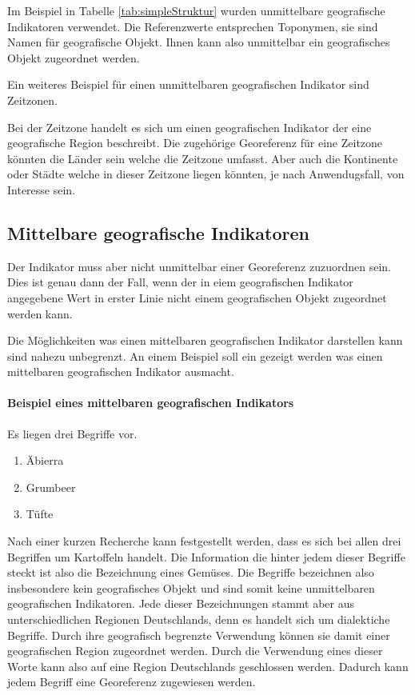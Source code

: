 				Im Beispiel in Tabelle \ref{tab:simpleStruktur} wurden unmittelbare geografische Indikatoren verwendet.
				Die Referenzwerte entsprechen Toponymen, sie sind Namen für geografische Objekt. 
				Ihnen kann also unmittelbar ein geografisches Objekt zugeordnet werden.

				Ein weiteres Beispiel für einen unmittelbaren geografischen Indikator sind Zeitzonen.

				Bei der Zeitzone handelt es sich um einen geografischen Indikator der eine geografische Region beschreibt. 
				Die zugehörige Georeferenz für eine Zeitzone könnten die Länder sein welche die Zeitzone umfasst. 
				Aber auch die Kontinente oder Städte welche in dieser Zeitzone liegen könnten, je nach Anwendugsfall, von Interesse sein.


			\subsection{Mittelbare geografische Indikatoren} 

				Der Indikator muss aber nicht unmittelbar einer Georeferenz zuzuordnen sein.
				Dies ist genau dann der Fall, wenn der in eiem geografischen Indikator angegebene Wert in erster Linie nicht einem geografischen Objekt zugeordnet werden kann.
				
				Die Möglichkeiten was einen mittelbaren geografischen Indikator darstellen kann sind nahezu unbegrenzt. 
				An einem Beispiel soll ein gezeigt werden was einen mittelbaren geografischen Indikator ausmacht.
				
				\paragraph{Beispiel eines mittelbaren geografischen Indikators} 

				Es liegen drei Begriffe vor.
				\begin{enumerate}
				 	\item Äbierra
				 	\item Grumbeer
				 	\item Tüfte 
				 \end{enumerate} 

				Nach einer kurzen Recherche kann festgestellt werden, dass es sich bei allen drei Begriffen um Kartoffeln handelt.
				Die Information die hinter jedem dieser Begriffe steckt ist also die Bezeichnung eines Gemüses.
				Die Begriffe bezeichnen also insbesondere kein geografisches Objekt und sind somit keine unmittelbaren geografischen Indikatoren.
				Jede dieser Bezeichnungen stammt aber aus unterschiedlichen Regionen Deutschlands, denn es handelt sich um dialektiche Begriffe.
				Durch ihre geografisch begrenzte Verwendung können sie damit einer geografischen Region zugeordnet werden.
				Durch die Verwendung eines dieser Worte kann also auf eine Region Deutschlands geschlossen werden.
				Dadurch kann jedem Begriff eine Georeferenz zugewiesen werden.

